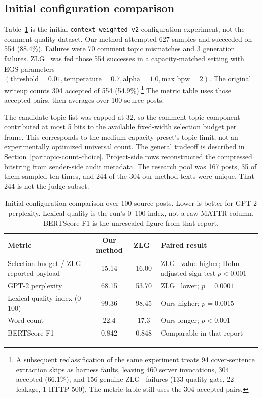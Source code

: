 \subsection{Initial configuration comparison}

Table~\ref{tab:paired-results} is the initial \texttt{context\_weighted\_v2} configuration experiment, not the comment-quality dataset.
Our method attempted 627 samples and succeeded on 554 (88.4\%).
Failures were 70 comment topic mismatches and 3 generation failures.
ZLG~\cite{lin2024zero} was fed those 554 successes in a capacity-matched setting with EGS parameters $(\text{threshold}=0.01,\text{temperature}=0.7,\text{alpha}=1.0,\text{max\_bpw}=2)$.
The original writeup counts 304 accepted of 554 (54.9\%).\footnote{A subsequent reclassification of the same experiment treats 94 cover-sentence extraction skips as harness faults, leaving 460 server invocations, 304 accepted (66.1\%), and 156 genuine ZLG~\cite{lin2024zero} failures (133 quality-gate, 22 leakage, 1 HTTP 500). The metric table still uses the 304 accepted pairs.}
The metric table uses those accepted pairs, then averages over 100 source posts.

The candidate topic list was capped at 32, so the comment topic component contributed at most 5 bits to the available fixed-width selection budget per frame.
This corresponds to the medium capacity preset's topic limit, not an experimentally optimized universal count. The general tradeoff is described in Section~\ref{par:topic-count-choice}.
Project-side rows reconstructed the compressed bitstring from sender-side audit metadata.
The research pool was 167 posts, 35 of them sampled ten times, and 244 of the 304 our-method texts were unique.
That 244 is not the judge subset.

\begin{table}[H]
\centering
\caption{Initial configuration comparison over 100 source posts. Lower is better for GPT-2 perplexity. Lexical quality is the run's 0--100 index, not a raw MATTR column. BERTScore F1 is the unrescaled figure from that report.}
\label{tab:paired-results}
\small
\begin{tabularx}{\columnwidth}{|l|c|c|X|}
\hline
Metric & Our method & ZLG~\cite{lin2024zero} & Paired result \\
\hline
Selection budget / ZLG~\cite{lin2024zero} reported payload & 15.14 & 16.00 & ZLG~\cite{lin2024zero} value higher; Holm-adjusted sign-test $p<0.001$ \\
\hline
GPT-2 perplexity & 68.15 & 53.70 & ZLG~\cite{lin2024zero} lower; $p=0.0001$ \\
\hline
Lexical quality index (0--100) & 99.36 & 98.45 & Ours higher; $p=0.0015$ \\
\hline
Word count & 22.4 & 17.3 & Ours longer; $p<0.001$ \\
\hline
BERTScore F1 & 0.842 & 0.848 & Comparable in that report \\
\hline
\end{tabularx}
\end{table}

